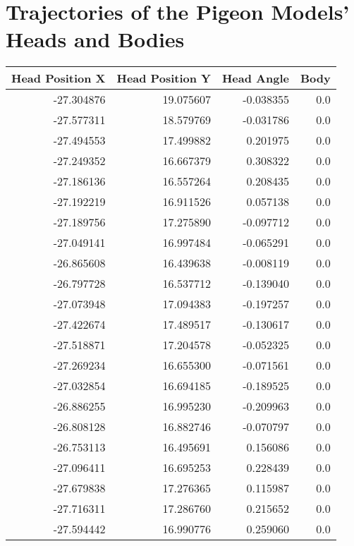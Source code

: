 \section{Trajectories of the Pigeon Models' Heads and Bodies}

\begin{tabular}{rrrr}
\toprule
 Head Position X &  Head Position Y &  Head Angle &  Body \\
\midrule
      -27.304876 &        19.075607 &   -0.038355 &   0.0 \\
      -27.577311 &        18.579769 &   -0.031786 &   0.0 \\
      -27.494553 &        17.499882 &    0.201975 &   0.0 \\
      -27.249352 &        16.667379 &    0.308322 &   0.0 \\
      -27.186136 &        16.557264 &    0.208435 &   0.0 \\
      -27.192219 &        16.911526 &    0.057138 &   0.0 \\
      -27.189756 &        17.275890 &   -0.097712 &   0.0 \\
      -27.049141 &        16.997484 &   -0.065291 &   0.0 \\
      -26.865608 &        16.439638 &   -0.008119 &   0.0 \\
      -26.797728 &        16.537712 &   -0.139040 &   0.0 \\
      -27.073948 &        17.094383 &   -0.197257 &   0.0 \\
      -27.422674 &        17.489517 &   -0.130617 &   0.0 \\
      -27.518871 &        17.204578 &   -0.052325 &   0.0 \\
      -27.269234 &        16.655300 &   -0.071561 &   0.0 \\
      -27.032854 &        16.694185 &   -0.189525 &   0.0 \\
      -26.886255 &        16.995230 &   -0.209963 &   0.0 \\
      -26.808128 &        16.882746 &   -0.070797 &   0.0 \\
      -26.753113 &        16.495691 &    0.156086 &   0.0 \\
      -27.096411 &        16.695253 &    0.228439 &   0.0 \\
      -27.679838 &        17.276365 &    0.115987 &   0.0 \\
      -27.716311 &        17.286760 &    0.215652 &   0.0 \\
      -27.594442 &        16.990776 &    0.259060 &   0.0 \\

\end{tabular}
